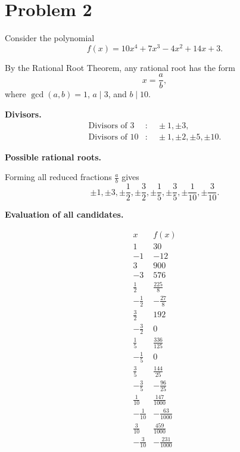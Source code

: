 \documentclass[12pt]{article}
\begin{document}
\section*{Problem 2}

Consider the polynomial
\[
f(x) = 10x^4 + 7x^3 - 4x^2 + 14x + 3.
\]

By the Rational Root Theorem, any rational root has the form
\[
x = \frac{a}{b},
\]
where $\gcd(a,b)=1$, $a \mid 3$, and $b \mid 10$.

\medskip

\textbf{Divisors.}
\[
\begin{aligned}
\text{Divisors of } 3 &: \quad \pm 1, \pm 3, \\
\text{Divisors of } 10 &: \quad \pm 1, \pm 2, \pm 5, \pm 10.
\end{aligned}
\]

\medskip

\textbf{Possible rational roots.}

Forming all reduced fractions $\frac{a}{b}$ gives
\[
\pm 1, \pm 3, \pm \frac{1}{2}, \pm \frac{3}{2},
\pm \frac{1}{5}, \pm \frac{3}{5},
\pm \frac{1}{10}, \pm \frac{3}{10}.
\]

\medskip

\textbf{Evaluation of all candidates.}

\[
\begin{array}{c|c}
x & f(x) \\ \hline
1 & 30 \\
-1 & -12 \\
3 & 900 \\
-3 & 576 \\
\frac{1}{2} & \frac{225}{8} \\
-\frac{1}{2} & -\frac{27}{8} \\
\frac{3}{2} & 192 \\
-\frac{3}{2} & 0 \\
\frac{1}{5} & \frac{336}{125} \\
-\frac{1}{5} & 0 \\
\frac{3}{5} & \frac{144}{25} \\
-\frac{3}{5} & -\frac{96}{25} \\
\frac{1}{10} & \frac{147}{1000} \\
-\frac{1}{10} & -\frac{63}{1000} \\
\frac{3}{10} & \frac{459}{1000} \\
-\frac{3}{10} & -\frac{231}{1000}
\end{array}
\]
\end{document}
